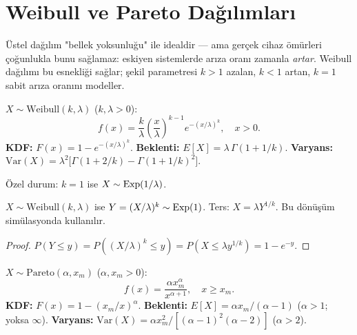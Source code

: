 \section{Weibull ve Pareto Dağılımları}
\label{sec:weibull_pareto}

\begin{motivasyon}
Üstel dağılım "bellek yoksunluğu" ile idealdir --- ama gerçek cihaz ömürleri çoğunlukla
bunu sağlamaz: eskiyen sistemlerde arıza oranı zamanla \emph{artar}.
Weibull dağılımı bu esnekliği sağlar; şekil parametresi $k > 1$ azalan,
$k < 1$ artan, $k = 1$ sabit arıza oranını modeller.
\end{motivasyon}

\begin{tanim}
\label{def:weibull}
$X \sim \mathrm{Weibull}(k, \lambda)$ ($k, \lambda > 0$):
\[
  f(x) = \frac{k}{\lambda}\left(\frac{x}{\lambda}\right)^{k-1} e^{-(x/\lambda)^k}, \quad x > 0.
\]
\textbf{KDF:} $F(x) = 1 - e^{-(x/\lambda)^k}$.
\textbf{Beklenti:} $E[X] = \lambda\,\Gamma(1+1/k)$.
\textbf{Varyans:} $\mathrm{Var}(X) = \lambda^2\bigl[\Gamma(1+2/k) - \Gamma(1+1/k)^2\bigr]$.

Özel durum: $k = 1$ ise $X \sim \operatorname{Exp}(1/\lambda)$.
\end{tanim}

\begin{onerme}
$X \sim \mathrm{Weibull}(k, \lambda)$ ise $Y = (X/\lambda)^k \sim \operatorname{Exp}(1)$.
Ters: $X = \lambda Y^{1/k}$. Bu dönüşüm simülasyonda kullanılır.
\end{onerme}

\begin{proof}
$P(Y \leq y) = P((X/\lambda)^k \leq y) = P(X \leq \lambda y^{1/k}) = 1 - e^{-y}$. \checkmark
\end{proof}

\begin{tanim}
\label{def:pareto}
$X \sim \mathrm{Pareto}(\alpha, x_m)$ ($\alpha, x_m > 0$):
\[
  f(x) = \frac{\alpha x_m^\alpha}{x^{\alpha+1}}, \quad x \geq x_m.
\]
\textbf{KDF:} $F(x) = 1 - (x_m/x)^\alpha$.
\textbf{Beklenti:} $E[X] = \alpha x_m/(\alpha-1)$ ($\alpha > 1$; yoksa $\infty$).
\textbf{Varyans:} $\mathrm{Var}(X) = \alpha x_m^2/[(\alpha-1)^2(\alpha-2)]$ ($\alpha > 2$).
\end{tanim}


